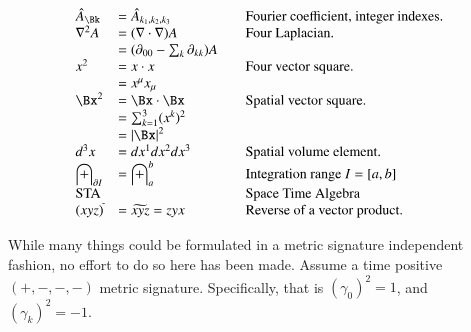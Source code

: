 \documentclass{article}
\begin{document}
\begin{equation*}
\begin{array}{l l l}
\hat{A}_{\Bk} &= \hat{A}_{k_1,k_2,k_3} & \quad \mbox{Fourier coefficient, integer indexes.} \\ 
\grad^2 A
   &= (\grad \cdot \grad) A & \quad \mbox{Four Laplacian. } \\
   &= (\partial_{00} - \sum_k \partial_{kk}) A & \\
x^2 &= x \cdot x & \quad \mbox{Four vector square. } \\
    &= x^\mu x_\mu \\
\Bx^2 &= \Bx \cdot \Bx & \quad \mbox{Spatial vector square. } \\
    &= \sum_{k=1}^3 (x^k)^2 \\
    &= \Abs{\Bx}^2 \\
d^3 x &= dx^1 dx^2 dx^3 & \quad \mbox{Spatial volume element. } \\
\int_{\partial I} &= \int_{a}^{b} & \quad \mbox{Integration range $I = [a,b]$ } \\
\text{STA} & & \quad \mbox{Space Time Algebra} \\
(xyz)^{\tilde{}} &= \widetilde{xyz} = z y x & \quad \mbox{Reverse of a vector product.} \\
\end{array}
\end{equation*}

While many things could be formulated in a metric signature independent fashion, no effort to do so here has been made.  Assume
a time positive
$(+,-,-,-)$
metric signature.  Specifically, that is $(\gamma_0)^2 = 1$, and $(\gamma_k)^2 = -1$.  


%



\end{document}
